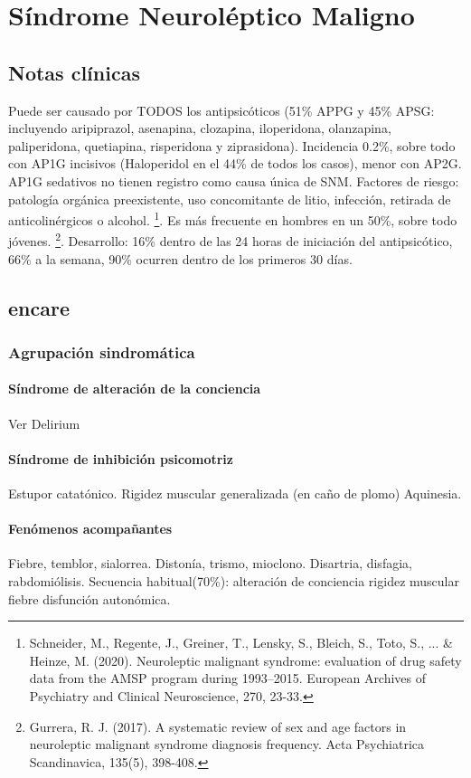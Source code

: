 \chapter{Síndrome Neuroléptico Maligno}
\section*{Notas clínicas}
Puede ser causado por TODOS los antipsicóticos (51\% APPG y 45\% APSG: incluyendo aripiprazol, asenapina, clozapina, iloperidona, olanzapina, paliperidona, quetiapina, risperidona y ziprasidona). Incidencia 0.2\%, sobre todo con AP1G incisivos (Haloperidol en el 44\% de todos los casos), menor con AP2G. AP1G sedativos no tienen registro como causa única de SNM. 
Factores de riesgo: patología orgánica preexistente, uso concomitante de litio, infección, retirada de anticolinérgicos o alcohol. \footnote{Schneider, M., Regente, J., Greiner, T., Lensky, S., Bleich, S., Toto, S., ... \& Heinze, M. (2020). Neuroleptic malignant syndrome: evaluation of drug safety data from the AMSP program during 1993–2015. European Archives of Psychiatry and Clinical Neuroscience, 270, 23-33.}. Es más frecuente en hombres en un 50\%, sobre todo jóvenes. \footnote{Gurrera, R. J. (2017). A systematic review of sex and age factors in neuroleptic malignant syndrome diagnosis frequency. Acta Psychiatrica Scandinavica, 135(5), 398-408.}. 
Desarrollo: 16\% dentro de las 24 horas de iniciación del antipsicótico, 66\% a la semana, 90\% ocurren dentro de los primeros 30 días.
\section*{encare}
\subsection*{Agrupación sindromática}
\subsubsection*{Síndrome de alteración de la conciencia}
Ver Delirium
\subsubsection*{Síndrome de inhibición psicomotriz}
Estupor catatónico.
Rigidez muscular generalizada (en caño de plomo)
Aquinesia.
\subsubsection*{Fenómenos acompañantes}
Fiebre, temblor, sialorrea. Distonía, trismo, mioclono. Disartria, disfagia, rabdomiólisis.
Secuencia habitual(70\%): alteración de conciencia \faArrowRight rigidez muscular \faArrowRight fiebre \faArrowRight disfunción autonómica.
